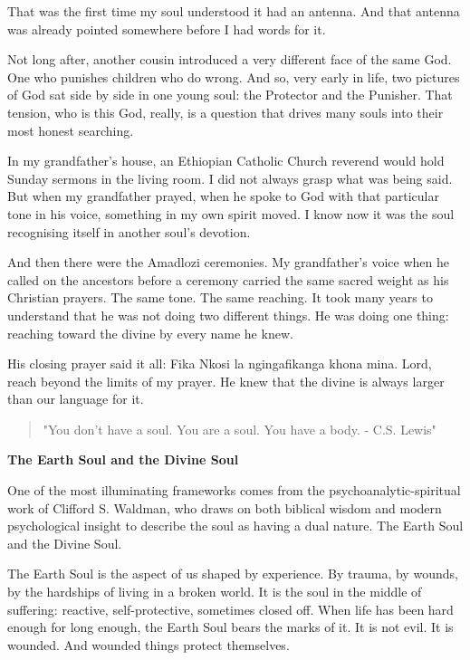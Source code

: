 That was the first time my soul understood it had an antenna. And that
antenna was already pointed somewhere before I had words for it.

Not long after, another cousin introduced a very different face of the
same God. One who punishes children who do wrong. And so, very early in
life, two pictures of God sat side by side in one young soul: the
Protector and the Punisher. That tension, who is this God, really, is a
question that drives many souls into their most honest searching.

In my grandfather's house, an Ethiopian Catholic Church reverend would
hold Sunday sermons in the living room. I did not always grasp what was
being said. But when my grandfather prayed, when he spoke to God with
that particular tone in his voice, something in my own spirit moved. I
know now it was the soul recognising itself in another soul's devotion.

And then there were the Amadlozi ceremonies. My grandfather's voice when
he called on the ancestors before a ceremony carried the same sacred
weight as his Christian prayers. The same tone. The same reaching. It
took many years to understand that he was not doing two different
things. He was doing one thing: reaching toward the divine by every name
he knew.

His closing prayer said it all: Fika Nkosi la ngingafikanga khona mina.
Lord, reach beyond the limits of my prayer. He knew that the divine is
always larger than our language for it.

\begin{quote}
"You don't have a soul. You are a soul. You have a body. - C.S. Lewis"
\end{quote}

\textbf{The Earth Soul and the Divine Soul}

One of the most illuminating frameworks comes from the
psychoanalytic-spiritual work of Clifford S. Waldman, who draws on both
biblical wisdom and modern psychological insight to describe the soul as
having a dual nature. The Earth Soul and the Divine Soul.

The Earth Soul is the aspect of us shaped by experience. By trauma, by
wounds, by the hardships of living in a broken world. It is the soul in
the middle of suffering: reactive, self-protective, sometimes closed
off. When life has been hard enough for long enough, the Earth Soul
bears the marks of it. It is not evil. It is wounded. And wounded things
protect themselves.

